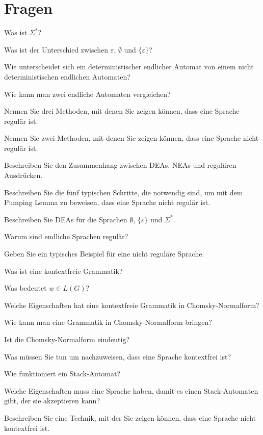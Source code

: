 \documentclass[a4paper,12pt,twocolumn]{article}
\begin{document}
\section{Fragen}
\begin{compactenum}
\item Was ist $\Sigma^*$?
\item Was ist der Unterschied zwischen $\varepsilon$, $\emptyset$ und
$\{\varepsilon\}$?
\item Wie unterscheidet sich ein deterministischer endlicher Automat
von einem nicht deterministischen endlichen Automaten?
\item Wie kann man zwei endliche Automaten vergleichen?
\item Nennen Sie drei Methoden, mit denen Sie zeigen können, dass eine Sprache
regulär ist.
\item Nennen Sie zwei Methoden, mit denen Sie zeigen können, dass eine Sprache
nicht regulär ist.
\item Beschreiben Sie den Zusammenhang zwischen DEAs, NEAs und regulären
Ausdrücken.
\item Beschreiben Sie die fünf typischen Schritte, die notwendig sind,
um mit dem Pumping Lemma zu beweisen, dass eine Sprache nicht regulär ist.
\item Beschreiben Sie DEAs für die Sprachen $\emptyset$, $\{\varepsilon\}$
und $\Sigma^*$.
\item Warum sind endliche Sprachen regulär?
\item Geben Sie ein typisches Beispiel für eine nicht reguläre Sprache.
\item Was ist eine kontextfreie Grammatik?
\item Was bedeutet $w\in L(G)$?
\item Welche Eigenschaften hat eine kontextfreie Grammatik in
Chomsky-Normalform?
\item Wie kann man eine Grammatik in Chomsky-Normalform bringen?
\item Ist die Chomsky-Normalform eindeutig?
\item Was müssen Sie tun um nachzuweisen, dass eine Sprache kontextfrei ist?
\item Wie funktioniert ein Stack-Automat?
\item Welche Eigenschaften muss eine Sprache haben, damit es einen
Stack-Automaten gibt, der sie akzeptieren kann?
\item Beschreiben Sie eine Technik, mit der Sie zeigen können, dass eine
Sprache nicht kontextfrei ist.

\end{compactenum}
\end{document}
